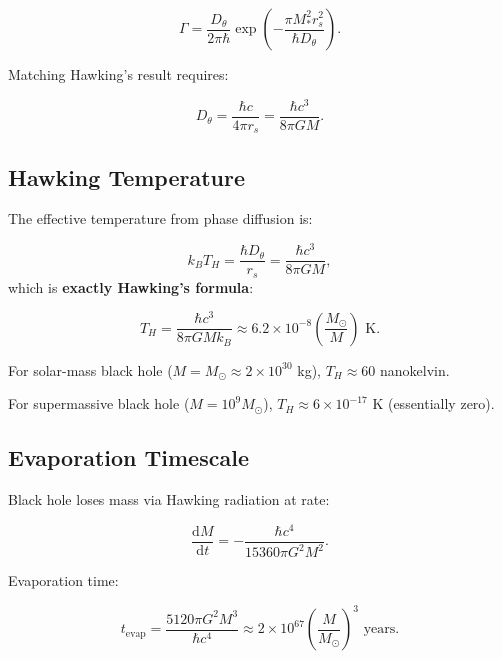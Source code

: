 \documentclass[11pt,a4paper]{article}
\numberwithin{equation}{section}
\theoremstyle{plain}
\theoremstyle{definition}
\theoremstyle{remark}
\renewcommand{\dd}{\mathrm{d}}
\begin{document}
\begin{equation}
\Gamma = \frac{D_\theta}{2\pi \hbar} \exp\left(-\frac{\pi M_*^2 r_s^2}{\hbar D_\theta}\right).
\end{equation}

Matching Hawking's result requires:

\begin{equation}
D_\theta = \frac{\hbar c}{4\pi r_s} = \frac{\hbar c^3}{8\pi GM}.
\label{eq:diffusion-hawking}
\end{equation}

\subsection{Hawking Temperature}

The effective temperature from phase diffusion is:

\begin{equation}
k_B T_H = \frac{\hbar D_\theta}{r_s} = \frac{\hbar c^3}{8\pi GM},
\label{eq:hawking-temperature}
\end{equation}
which is \textbf{exactly Hawking's formula}:

\begin{equation}
T_H = \frac{\hbar c^3}{8\pi GMk_B} \approx 6.2 \times 10^{-8} \left(\frac{M_\odot}{M}\right) \text{ K}.
\end{equation}

For solar-mass black hole ($M = M_\odot \approx 2 \times 10^{30}$ kg), $T_H \approx 60$ nanokelvin.

For supermassive black hole ($M = 10^9 M_\odot$), $T_H \approx 6 \times 10^{-17}$ K (essentially zero).

\subsection{Evaporation Timescale}

Black hole loses mass via Hawking radiation at rate:

\begin{equation}
\frac{\dd M}{\dd t} = -\frac{\hbar c^4}{15360\pi G^2 M^2}.
\end{equation}

Evaporation time:

\begin{equation}
t_{\text{evap}} = \frac{5120\pi G^2 M^3}{\hbar c^4} \approx 2 \times 10^{67} \left(\frac{M}{M_\odot}\right)^3 \text{ years}.
\end{equation}
\end{document}
